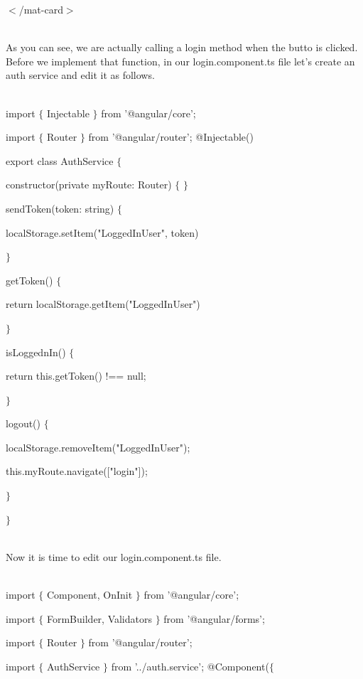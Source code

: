\documentclass{article}
\begin{document}
\noindent $\mathrm{<}$/mat-card$\mathrm{>}$

\noindent \\ As you can see, we are actually calling a login method when the butto is clicked. Before we implement that function, in our login.component.ts file let's create an auth service and edit it as follows.

\noindent \\ import $\mathrm{\{}$ Injectable $\mathrm{\}}$ from '@angular/core'; 

\noindent import $\mathrm{\{}$ Router $\mathrm{\}}$ from '@angular/router'; @Injectable()

\noindent export class AuthService $\mathrm{\{}$ 

\noindent constructor(private myRoute: Router) $\mathrm{\{}$ $\mathrm{\}}$ 

\noindent sendToken(token: string) $\mathrm{\{}$

\noindent localStorage.setItem("LoggedInUser", token)

\noindent $\mathrm{\}}$

\noindent getToken() $\mathrm{\{}$

\noindent return localStorage.getItem("LoggedInUser")

\noindent $\mathrm{\}}$

\noindent isLoggednIn() $\mathrm{\{}$

\noindent return this.getToken() !== null;

\noindent $\mathrm{\}}$

\noindent logout() $\mathrm{\{}$ 

\noindent localStorage.removeItem("LoggedInUser"); 

\noindent this.myRoute.navigate(["login"]);

\noindent $\mathrm{\}}$

\noindent $\mathrm{\}}$

\noindent \\ Now it is time to edit our login.component.ts file.

\noindent \\ import $\mathrm{\{}$ Component, OnInit $\mathrm{\}}$ from '@angular/core'; 

\noindent import $\mathrm{\{}$ FormBuilder, Validators $\mathrm{\}}$ from '@angular/forms'; 

\noindent import $\mathrm{\{}$ Router $\mathrm{\}}$ from '@angular/router';

\noindent import $\mathrm{\{}$ AuthService $\mathrm{\}}$ from '../auth.service'; @Component($\mathrm{\{}$
\end{document}
